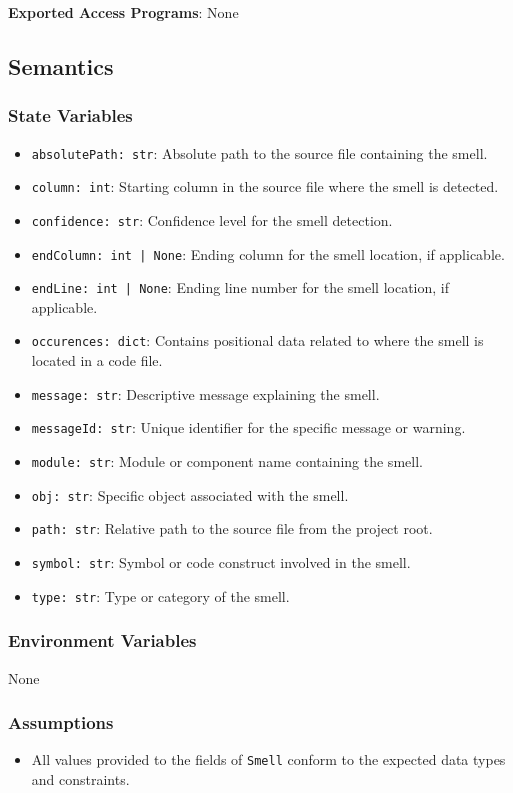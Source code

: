 \documentclass[12pt, titlepage]{article}
\begin{document}
\noindent
\textbf{Exported Access Programs}: None

\subsection{Semantics}

\subsubsection{State Variables}
\begin{itemize}
  \item \texttt{absolutePath: str}: Absolute path to the source file containing the smell.
  \item \texttt{column: int}: Starting column in the source file where the smell is detected.
  \item \texttt{confidence: str}: Confidence level for the smell detection.
  \item \texttt{endColumn: int | None}: Ending column for the smell location, if applicable.
  \item \texttt{endLine: int | None}: Ending line number for the smell location, if applicable.
  \item \texttt{occurences: dict}: Contains positional data related to where the smell is located in a code file.
  \item \texttt{message: str}: Descriptive message explaining the smell.
  \item \texttt{messageId: str}: Unique identifier for the specific message or warning.
  \item \texttt{module: str}: Module or component name containing the smell.
  \item \texttt{obj: str}: Specific object associated with the smell.
  \item \texttt{path: str}: Relative path to the source file from the project root.
  \item \texttt{symbol: str}: Symbol or code construct involved in the smell.
  \item \texttt{type: str}: Type or category of the smell.
\end{itemize}

\subsubsection{Environment Variables}
None

\subsubsection{Assumptions}
\begin{itemize}
  \item All values provided to the fields of \texttt{Smell} conform to the expected data types and constraints.
\end{itemize}
\end{document}
